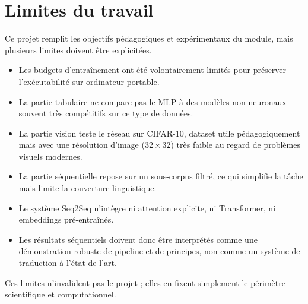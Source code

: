\chapter{Limites du travail}

Ce projet remplit les objectifs pédagogiques et expérimentaux du module, mais plusieurs limites doivent être explicitées.

\begin{itemize}[leftmargin=1.2cm]
    \item Les budgets d’entraînement ont été volontairement limités pour préserver l’exécutabilité sur ordinateur portable.
    \item La partie tabulaire ne compare pas le MLP à des modèles non neuronaux souvent très compétitifs sur ce type de données.
    \item La partie vision teste le réseau sur CIFAR-10, dataset utile pédagogiquement mais avec une résolution d'image ($32\times32$) très faible au regard de problèmes visuels modernes.
    \item La partie séquentielle repose sur un sous-corpus filtré, ce qui simplifie la tâche mais limite la couverture linguistique.
    \item Le système Seq2Seq n’intègre ni attention explicite, ni Transformer, ni embeddings pré-entraînés.
    \item Les résultats séquentiels doivent donc être interprétés comme une démonstration robuste de pipeline et de principes, non comme un système de traduction à l’état de l’art.
\end{itemize}

Ces limites n’invalident pas le projet ; elles en fixent simplement le périmètre scientifique et computationnel.

